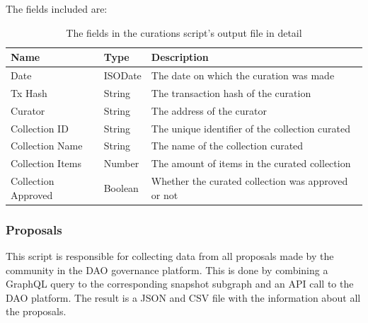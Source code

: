 \documentclass[MSE,Master,english]{twbook}%
\begin{document}
The fields included are:
\begin{table}[H]
  \centering
  \begin{tabularx}{\textwidth}{|l|l|X|}
  \hline
  \textbf{Name}       & \textbf{Type} & \textbf{Description}                               \\ \hline
  Date                & ISODate       & The date on which the curation was made            \\ \hline
  Tx Hash             & String        & The transaction hash of the curation               \\ \hline
  Curator             & String        & The address of the curator                         \\ \hline
  Collection ID       & String        & The unique identifier of the collection curated    \\ \hline
  Collection Name     & String        & The name of the collection curated                 \\ \hline
  Collection Items    & Number        & The amount of items in the curated collection      \\ \hline
  Collection Approved & Boolean       & Whether the curated collection was approved or not \\ \hline
  \end{tabularx}
  \caption{The fields in the curations script's output file in detail}
  \label{table:curations}
  \end{table}


\subsubsection{Proposals\label{proposals-script}}
This script is responsible for collecting data from all proposals made by the community in the \gls{DAO} governance platform. This is done by combining a GraphQL query to the corresponding snapshot subgraph and an API call to the \gls{DAO} platform. The result is a JSON and CSV file with the information about all the proposals. \\
\end{document}

